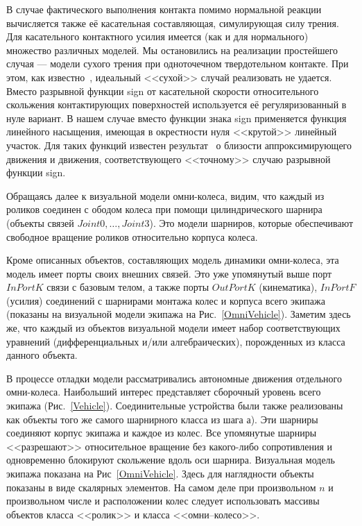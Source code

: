 \documentclass[12pt,a4paper]{article}
\begin{document}
В случае фактического выполнения контакта помимо нормальной реакции вычисляется
также её касательная составляющая, симулирующая силу трения. Для касательного 
контактного усилия имеется (как и для нормального) множество различных моделей. 
Мы остановились на реализации простейшего случая --- модели сухого трения при 
одноточечном твердотельном контакте. При этом, как известно~\cite{Novozhilov}, 
идеальный <<сухой>> случай реализовать не удается. Вместо разрывной функции 
sign от касательной скорости относительного скольжения контактирующих 
поверхностей используется её регуляризованный в нуле вариант. В нашем случае 
вместо функции знака sign применяется функция линейного насыщения, имеющая в 
окрестности нуля <<крутой>> линейный участок. Для таких функций известен 
результат~\cite{Novozhilov} о близости аппроксимирующего движения и движения, 
соответствующего <<точному>> случаю разрывной функции sign.

Обращаясь далее к визуальной модели омни-колеса, видим, что каждый из роликов 
соединен с ободом колеса при помощи цилиндрического шарнира (объекты связей
$Joint0,\dots ,Joint3$). Это модели шарниров, которые обеспечивают свободное
вращение роликов относительно корпуса колеса.

Кроме описанных объектов, составляющих модель динамики омни-колеса, эта модель
имеет порты своих внешних связей. Это уже упомянутый выше порт $InPortK$ связи
с базовым телом, а также порты $OutPortK$ (кинематика), $InPortF$ (усилия) 
соединений с шарнирами монтажа колес и корпуса всего экипажа (показаны на 
визуальной модели экипажа на Рис.~\ref{OmniVehicle}). Заметим здесь же, что 
каждый из объектов визуальной модели имеет набор соответствующих уравнений
(дифференциальных и/или алгебраических), порожденных из класса данного объекта.

В процессе отладки модели рассматривались автономные движения отдельного 
омни-колеса. Наибольший интерес представляет сборочный уровень всего экипажа
(Рис.~\ref{Vehicle}). Соединительные устройства были также реализованы как 
объекты того же самого шарнирного класса из шага а). Эти шарниры соединяют 
корпус экипажа и каждое из колес. Все упомянутые шарниры <<разрешают>> 
относительное вращение без какого-либо сопротивления и одновременно блокируют
скольжение вдоль оси шарнира. Визуальная модель экипажа показана на 
Рис~\ref{OmniVehicle}. Здесь для наглядности объекты показаны в виде скалярных
элементов. На самом деле при произвольном $n$ и произвольном числе и 
расположении колес следует использовать массивы объектов класса <<ролик>> и 
класса <<омни--колесо>>.
\end{document}
